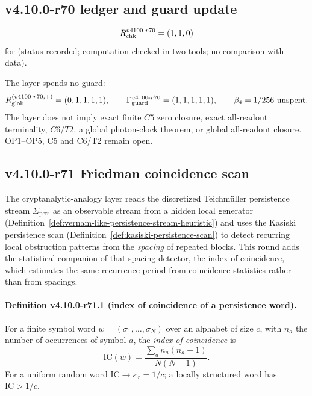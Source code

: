 \subsection*{v4.10.0-r70 ledger and guard update}
\label{subsec:v4100-r70-ledger-guard}

\[
R_{\rm chk}^{v4100\text{-}r70}=(1,1,0)
\]
for (status recorded; computation checked in two tools; no comparison with data).

The layer spends no guard:
\[
R_{\rm glob}^{(v4100\text{-}r70,+)}=(0,1,1,1,1),
\qquad
\Gamma_{\rm guard}^{v4100\text{-}r70}=(1,1,1,1,1),
\qquad
\beta_4=1/256\ \text{unspent}.
\]
The layer does not imply exact finite \(C5\) zero closure, exact all-readout terminality, \(C6/T2\), a global photon-clock theorem,
or global all-readout closure.  OP1--OP5, C5 and C6/T2 remain open.

\subsection*{v4.10.0-r71 Friedman coincidence scan}
\label{subsec:v4100-r71-friedman}

The cryptanalytic-analogy layer reads the discretized Teichm\"uller persistence stream \(\Sigma_{\mathrm{pers}}\) as an
observable stream from a hidden local generator (Definition~\ref{def:vernam-like-persistence-stream-heuristic}) and uses the
Kasiski persistence scan (Definition~\ref{def:kasiski-persistence-scan}) to detect recurring local obstruction patterns from
the \emph{spacing} of repeated blocks.  This round adds the statistical companion of that spacing detector, the index of
coincidence, which estimates the same recurrence period from coincidence statistics rather than from spacings.

\paragraph{Definition v4.10.0-r71.1 (index of coincidence of a persistence word).}
For a finite symbol word \(w=(\sigma_1,\dots,\sigma_N)\) over an alphabet of size \(c\), with \(n_a\) the number of
occurrences of symbol \(a\), the \emph{index of coincidence} is
\[
\mathrm{IC}(w)=\frac{\sum_a n_a(n_a-1)}{N(N-1)}.
\]
For a uniform random word \(\mathrm{IC}\to\kappa_r=1/c\); a locally structured word has \(\mathrm{IC}>1/c\).


